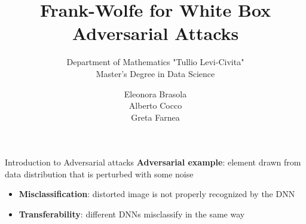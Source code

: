 \documentclass{beamer}
\title{Frank-Wolfe for White Box Adversarial Attacks}
\subtitle{\normalsize Department of Mathematics "Tullio Levi-Civita"\\
Master's Degree in Data Science}
\author[Greta Farnea]{\large Eleonora Brasola \\ Alberto Cocco \\ Greta Farnea}
\date{\vspace{.5cm} \;}
\institute[]{Università di Padova}
\theoremstyle{plain}
\theoremstyle{definition}
\begin{document}
\begin{frame}
\maketitle
\end{frame}

\begin{frame}{Introduction to Adversarial attacks}
\textbf{Adversarial example}: element drawn from data distribution that is perturbed with some noise
    \begin{itemize}
            \item \textbf{Misclassification}: distorted image is not properly recognized by the DNN
            \item \textbf{Transferability}: different DNNs misclassify in the same way
    \end{itemize}
\medskip


\end{frame}
\end{document}
